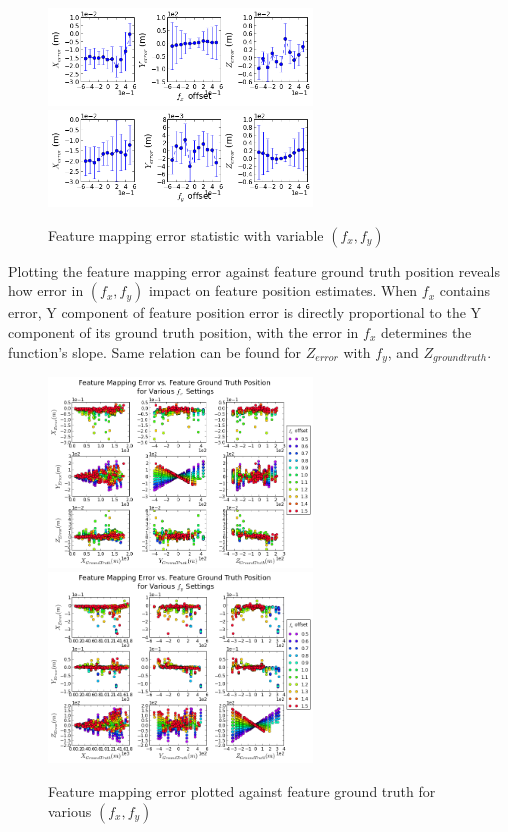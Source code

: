 \begin{figure}[h]
  \centering
  \includegraphics[width=7cm,keepaspectratio=true]{./Figures/SimulationFigures/Figure38.png}
  \includegraphics[width=7cm,keepaspectratio=true]{./Figures/SimulationFigures/Figure39.png}
  \caption{Feature mapping error statistic with variable $(f_x, f_y)$}
  \label{fig:simfig38-39}
\end{figure}

Plotting the feature mapping error against feature ground truth position reveals how error in $(f_x, f_y)$ impact on feature position estimates. When $f_x$ contains error, Y component of feature position error is directly proportional to the Y component of its ground truth position, with the error in $f_x$ determines the function's slope. Same relation can be found for $Z_{error}$ with $f_y$, and $Z_{ground truth}$.

\begin{figure}[h]
  \centering
  \includegraphics[width=7cm,keepaspectratio=true]{./Figures/SimulationFigures/Figure41.png}
  \includegraphics[width=7cm,keepaspectratio=true]{./Figures/SimulationFigures/Figure42.png}
  \caption{Feature mapping error plotted against feature ground truth
    for various $(f_x, f_y)$}
  \label{fig:simfig38-39}
\end{figure}

